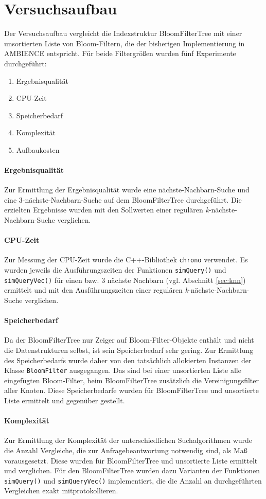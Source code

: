 \section{Versuchsaufbau}\label{sec:versuchsaufbau}
Der Versuchsaufbau vergleicht die Indexstruktur BloomFilterTree mit einer unsortierten Liste von Bloom-Filtern, die der bisherigen Implementierung in AMBIENCE entspricht. Für beide Filtergrößen wurden fünf Experimente durchgeführt:  
\begin{enumerate}
	\item Ergebnisqualität
	\item CPU-Zeit 
	\item Speicherbedarf 
	\item Komplexität 
	\item Aufbaukosten 
\end{enumerate}
\paragraph*{Ergebnisqualität}
Zur Ermittlung der Ergebnisqualität wurde eine nächste-Nachbarn-Suche und eine 3-nächste-Nachbarn-Suche auf dem BloomFilterTree durchgeführt. Die erzielten Ergebnisse wurden mit den Sollwerten einer regulären \textit{k}-nächste-Nachbarn-Suche verglichen. 
\paragraph*{CPU-Zeit}
Zur Messung der CPU-Zeit wurde die C++-Bibliothek \texttt{chrono} verwendet. Es wurden jeweils die Ausführungszeiten der Funktionen \texttt{simQuery()} und \texttt{simQueryVec()} für einen bzw. 3 nächste Nachbarn (vgl. Abschnitt \ref{sec:knn}) ermittelt und mit den Ausführungszeiten einer regulären \textit{k}-nächste-Nachbarn-Suche verglichen.
\paragraph*{Speicherbedarf} 
Da der BloomFilterTree nur Zeiger auf Bloom-Filter-Objekte enthält und nicht die Datenstrukturen selbst, ist sein Speicherbedarf sehr gering. %
Zur Ermittlung des Speicherbedarfs wurde daher von den tatsächlich allokierten Instanzen der Klasse \texttt{BloomFilter} ausgegangen. Das sind bei einer unsortierten Liste alle eingefügten Bloom-Filter, beim BloomFilterTree zusätzlich die Vereinigungsfilter aller Knoten. Diese Speicherbedarfe wurden für BloomFilterTree und unsortierte Liste ermittelt und gegenüber gestellt. 
\paragraph*{Komplexität}
Zur Ermittlung der Komplexität der unterschiedlichen Suchalgorithmen wurde die Anzahl Vergleiche, die zur Anfragebeantwortung notwendig sind, als Maß vorausgesetzt. Diese wurden für BloomFilterTree und unsortierte Liste ermittelt und verglichen. Für den BloomFilterTree wurden dazu Varianten der Funktionen \texttt{simQuery()} und \texttt{simQueryVec()} implementiert, die die Anzahl an durchgeführten Vergleichen exakt mitprotokollieren.   
